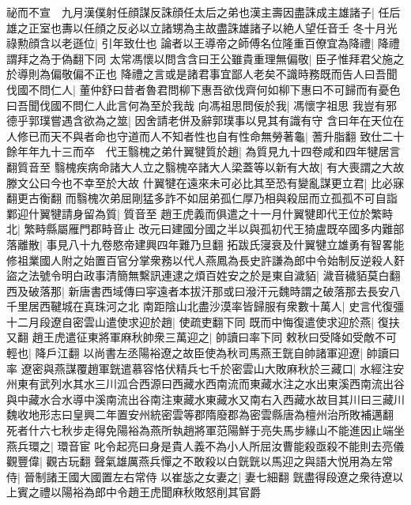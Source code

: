 祕而不宣　九月漢僕射任顔謀反誅顔任太后之弟也漢主壽因盡誅成主雄諸子|{
	任后雄之正室也夀以任顔之反必以立諸甥為主故盡誅雄諸子以絶人望任音壬}
冬十月光祿勲顔含以老遜位|{
	引年致仕也}
論者以王導帝之師傅名位隆重百僚宜為降禮|{
	降禮謂拜之為于偽翻下同}
太常馮懷以問含含曰王公雖貴重理無偏敬|{
	臣子惟拜君父施之於導則為偏敬偏不正也}
降禮之言或是諸君事宜鄙人老矣不識時務既而告人曰吾聞伐國不問仁人|{
	董仲舒曰昔者魯君問柳下惠吾欲伐齊何如柳下惠曰不可歸而有憂色曰吾聞伐國不問仁人此言何為至於我哉}
向馮祖思問佞於我|{
	馮懷字祖思}
我豈有邪德乎郭璞嘗遇含欲為之筮|{
	因舍請老併及辭郭璞事以見其有識有守}
含曰年在天位在人修已而天不與者命也守道而人不知者性也自有性命無勞著龜|{
	蓍升脂翻}
致仕二十餘年年九十三而卒　代王翳槐之弟什翼犍質於趙|{
	為質見九十四卷咸和四年犍居言翻質音至}
翳槐疾病命諸大人立之翳槐卒諸大人梁蓋等以新有大故|{
	有大喪謂之大故滕文公曰今也不幸至於大故}
什翼犍在遠來未可必比其至恐有變亂謀更立君|{
	比必寐翻更古衡翻}
而翳槐次弟屈剛猛多詐不如屈弟孤仁厚乃相與殺屈而立孤孤不可自詣鄴迎什翼犍請身留為質|{
	質音至}
趙王虎義而俱遣之十一月什翼犍即代王位於繁畤北|{
	繁畤縣屬雁門郡畤音止}
改元曰建國分國之半以與孤初代王猗盧既卒國多内難部落離散|{
	事見八十九卷愍帝建興四年難乃旦翻}
拓跋氏寖衰及什翼犍立雄勇有智畧能修祖業國人附之始置百官分掌衆務以代人燕鳳為長史許謙為郎中令始制反逆殺人姧盜之法號令明白政事清簡無繫訊連逮之煩百姓安之於是東自濊貊|{
	濊音穢貊莫白翻}
西及破落那|{
	新唐書西域傳曰寜遠者本拔汗那或曰潑汗元魏時謂之破落那去長安八千里居西鞬城在真珠河之北}
南距陰山北盡沙漠率皆歸服有衆數十萬人|{
	史言代復彊}
十二月段遼自密雲山遣使求迎於趙|{
	使疏吏翻下同}
既而中悔復遣使求迎於燕|{
	復扶又翻}
趙王虎遣征東將軍麻秋帥衆三萬迎之|{
	帥讀曰率下同}
敕秋曰受降如受敵不可輕也|{
	降戶江翻}
以尚書左丞陽裕遼之故臣使為秋司馬燕王皝自帥諸軍迎遼|{
	帥讀曰率}
遼密與燕謀覆趙軍皝遣慕容恪伏精兵七千於密雲山大敗麻秋於三藏口|{
	水經注安州東有武列水其水三川泒合西源曰西藏水西南流而東藏水注之水出東溪西南流出谷與中藏水合水導中溪南流出谷南注東藏水東藏水又南右入西藏水故目其川曰三藏川魏收地形志曰皇興二年置安州統密雲等郡隋廢郡為密雲縣唐為檀州治所敗補邁翻}
死者什六七秋步走得免陽裕為燕所執趙將軍范陽鮮于亮失馬步緣山不能進因止端坐燕兵環之|{
	環音宦}
叱令起亮曰身是貴人義不為小人所屈汝曹能殺亟殺不能則去亮儀觀豐偉|{
	觀古玩翻}
聲氣雄厲燕兵憚之不敢殺以白皝皝以馬迎之與語大悦用為左常侍|{
	晉制諸王國大國置左右常侍}
以崔毖之女妻之|{
	妻七細翻}
皝盡得段遼之衆待遼以上賓之禮以陽裕為郎中令趙王虎聞麻秋敗怒削其官爵


